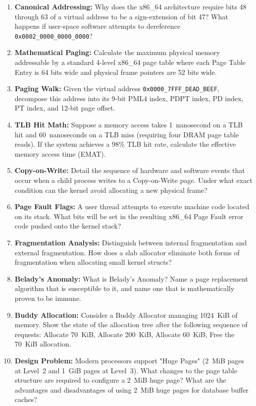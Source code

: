 \begin{enumerate}
    \item \textbf{Canonical Addressing:} Why does the x86\_64 architecture require bits 48 through 63 of a virtual address to be a sign-extension of bit 47? What happens if user-space software attempts to dereference \texttt{0x0002\_0000\_0000\_0000}?
    \item \textbf{Mathematical Paging:} Calculate the maximum physical memory addressable by a standard 4-level x86\_64 page table where each Page Table Entry is 64 bits wide and physical frame pointers are 52 bits wide.
    \item \textbf{Paging Walk:} Given the virtual address \texttt{0x0000\_7FFF\_DEAD\_BEEF}, decompose this address into its 9-bit PML4 index, PDPT index, PD index, PT index, and 12-bit page offset.
    \item \textbf{TLB Hit Math:} Suppose a memory access takes 1~nanosecond on a TLB hit and 60~nanoseconds on a TLB miss (requiring four DRAM page table reads). If the system achieves a 98\% TLB hit rate, calculate the effective memory access time (EMAT).
    \item \textbf{Copy-on-Write:} Detail the sequence of hardware and software events that occur when a child process writes to a Copy-on-Write page. Under what exact condition can the kernel avoid allocating a new physical frame?
    \item \textbf{Page Fault Flags:} A user thread attempts to execute machine code located on its stack. What bits will be set in the resulting x86\_64 Page Fault error code pushed onto the kernel stack?
    \item \textbf{Fragmentation Analysis:} Distinguish between internal fragmentation and external fragmentation. How does a slab allocator eliminate both forms of fragmentation when allocating small kernel structs?
    \item \textbf{Belady's Anomaly:} What is Belady's Anomaly? Name a page replacement algorithm that is susceptible to it, and name one that is mathematically proven to be immune.
    \item \textbf{Buddy Allocation:} Consider a Buddy Allocator managing 1024~KiB of memory. Show the state of the allocation tree after the following sequence of requests: Allocate 70~KiB, Allocate 200~KiB, Allocate 60~KiB, Free the 70~KiB allocation.
    \item \textbf{Design Problem:} Modern processors support "Huge Pages" (2~MiB pages at Level~2 and 1~GiB pages at Level~3). What changes to the page table structure are required to configure a 2~MiB huge page? What are the advantages and disadvantages of using 2~MiB huge pages for database buffer caches?
\end{enumerate}
